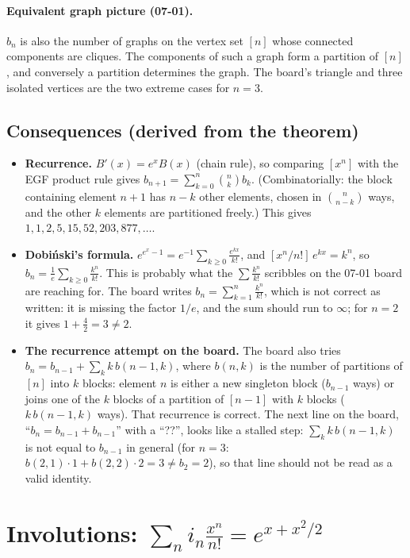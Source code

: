 \documentclass[11pt]{article}
\begin{document}
\paragraph{Equivalent graph picture (07-01).} $b_n$ is also the number of graphs on the vertex set $[n]$ whose connected components are cliques. The components of such a graph form a partition of $[n]$, and conversely a partition determines the graph. The board's triangle and three isolated vertices are the two extreme cases for $n=3$.

\subsection*{Consequences (derived from the theorem)}
\begin{itemize}
  \item \textbf{Recurrence.} $B'(x)=e^xB(x)$ (chain rule), so comparing $[x^n]$ with the EGF product rule gives $b_{n+1}=\sum_{k=0}^n\binom nkb_k$. (Combinatorially: the block containing element $n+1$ has $n-k$ other elements, chosen in $\binom n{n-k}$ ways, and the other $k$ elements are partitioned freely.) This gives $1,1,2,5,15,52,203,877,\dots$.
  \item \textbf{Dobi\'nski's formula.} $e^{e^x-1}=e^{-1}\sum_{k\ge0}\frac{e^{kx}}{k!}$, and $[x^n/n!]\,e^{kx}=k^n$, so $b_n=\frac1e\sum_{k\ge0}\frac{k^n}{k!}$. This is probably what the $\sum\frac{k^n}{k!}$ scribbles on the 07-01 board are reaching for. The board writes $b_n=\sum_{k=1}^n\frac{k^n}{k!}$, which is not correct as written: it is missing the factor $1/e$, and the sum should run to $\infty$; for $n=2$ it gives $1+\frac42=3\ne2$.
  \item \textbf{The recurrence attempt on the board.} The board also tries $b_n=b_{n-1}+\sum_kk\,b(n-1,k)$, where $b(n,k)$ is the number of partitions of $[n]$ into $k$ blocks: element $n$ is either a new singleton block ($b_{n-1}$ ways) or joins one of the $k$ blocks of a partition of $[n-1]$ with $k$ blocks ($k\,b(n-1,k)$ ways). That recurrence is correct. The next line on the board, ``$b_n=b_{n-1}+b_{n-1}$'' with a ``??'', looks like a stalled step: $\sum_kk\,b(n-1,k)$ is not equal to $b_{n-1}$ in general (for $n=3$: $b(2,1)\cdot1+b(2,2)\cdot2=3\ne b_2=2$), so that line should not be read as a valid identity.
\end{itemize}

\section{Involutions: $\displaystyle\sum_n i_n\frac{x^n}{n!}=e^{x+x^2/2}$}
\end{document}
